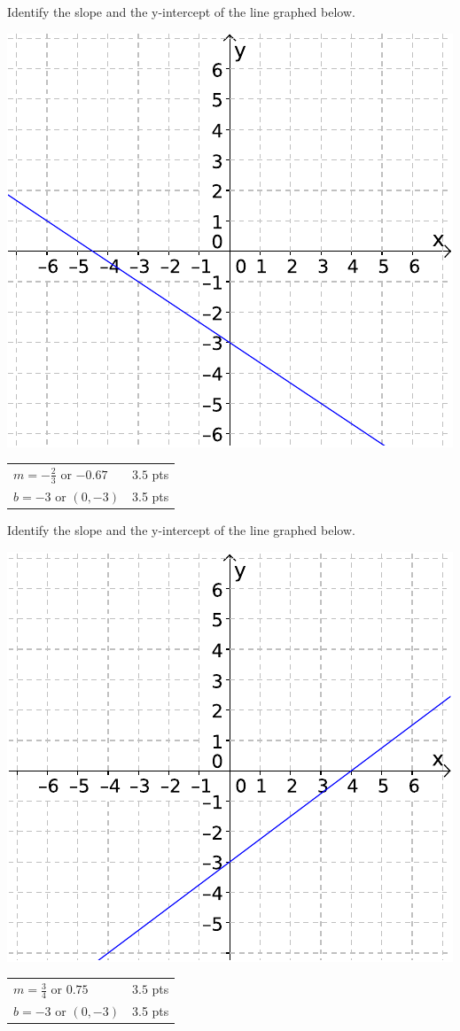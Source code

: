{
	Identify the slope and the y-intercept of the line graphed below.
	\begin{center}\includegraphics{fig095-11-c}\end{center}
}
{
	\begin{tabular}{l r}
	$m=-\frac{2}{3}$ or $-0.67$ & $3.5$ pts\\
	$b=-3$ or $(0,-3)$ & 3.5 pts
	\end{tabular}
}

{
	Identify the slope and the y-intercept of the line graphed below.
	\begin{center}\includegraphics{fig095-11-d}\end{center}
}
{
	\begin{tabular}{l r}
	$m=\frac{3}{4}$ or $0.75$ & $3.5$ pts\\
	$b=-3$ or $(0,-3)$ & 3.5 pts
	\end{tabular}
}
